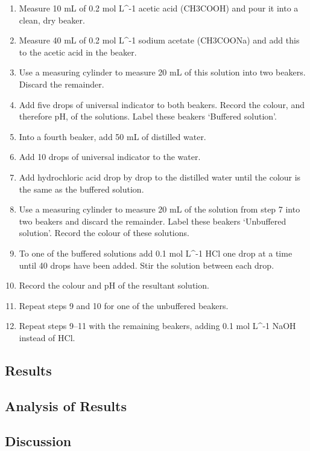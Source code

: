 		\begin{enumerate}
			\item Measure 10 mL of 0.2 mol L^{-1} acetic acid (CH3COOH) and pour it into a clean, dry beaker.
			\item Measure 40 mL of 0.2 mol L^{-1} sodium acetate (CH3COONa) and add this to the acetic acid in the beaker.
			\item Use a measuring cylinder to measure 20 mL of this solution into two beakers. Discard the remainder.
			\item Add five drops of universal indicator to both beakers. Record the colour, and therefore pH, of the solutions. Label these beakers ‘Buffered solution’.
			\item Into a fourth beaker, add 50 mL of distilled water.
			\item Add 10 drops of universal indicator to the water.
			\item Add hydrochloric acid drop by drop to the distilled water until the colour is the same as the buffered solution.
			\item Use a measuring cylinder to measure 20 mL of the solution from step 7 into two beakers and discard the remainder. Label these beakers ‘Unbuffered solution’. Record the colour of these solutions.
			\item To one of the buffered solutions add 0.1 mol L^{-1} HCl one drop at a time until 40 drops have been added. Stir the solution between each drop.
			\item Record the colour and pH of the resultant solution.
			\item Repeat steps 9 and 10 for one of the unbuffered beakers.
			\item Repeat steps 9–11 with the remaining beakers, adding 0.1 mol L^{-1} NaOH instead of HCl.
		\end{enumerate}

	\subsection{Results}
	
	\subsection{Analysis of Results}
	
	\subsection{Discussion}
	

